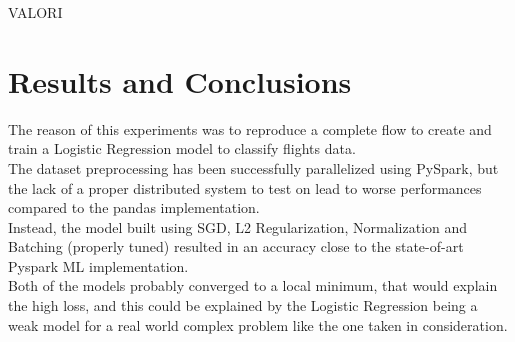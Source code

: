\documentclass[
	letterpaper, %
	10pt, %
]{class}
\begin{document}
VALORI


\section{Results and Conclusions}

The reason of this experiments was to reproduce a complete flow to create and train a Logistic Regression model to classify flights data.\\
The dataset preprocessing has been successfully parallelized using PySpark, but the lack of a proper distributed system to test on lead to worse performances compared to the pandas implementation.\\

Instead, the model built using SGD, L2 Regularization, Normalization and Batching (properly tuned) resulted in an accuracy close to the state-of-art Pyspark ML implementation.\\
Both of the models probably converged to a local minimum, that would explain the high loss, and this could be explained by the Logistic Regression being a weak model for a real world complex problem like the one taken in consideration.


\printbibliography %

\end{document}
